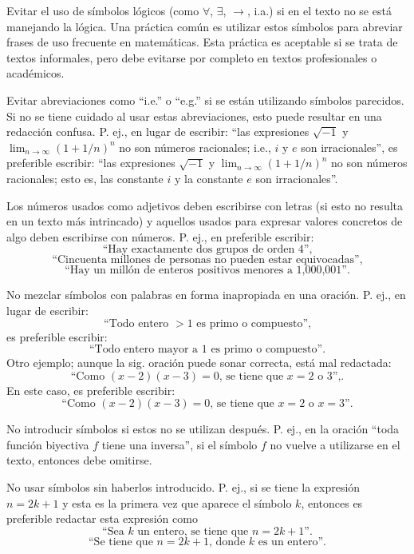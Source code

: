 Evitar el uso de símbolos lógicos (como \(\forall\), \(\exists\), \(\rightarrow\), i.a.) si en el texto no se está manejando la lógica. 
Una práctica común es utilizar estos símbolos para abreviar frases de uso frecuente en matemáticas.
Esta práctica es aceptable si se trata de textos informales, pero debe evitarse por completo en textos profesionales o académicos.

Evitar abreviaciones como ``i.e.'' o ``e.g.'' si se están utilizando símbolos parecidos.
Si no se tiene cuidado al usar estas abreviaciones, esto puede resultar en una redacción confusa.
P. ej., en lugar de escribir: ``las expresiones
\(\sqrt{-1}\) y \(\lim_{n\to\infty}(1+1/n)^{n}\) no son números
racionales; i.e., \(i\) y \(e\) son irracionales'', es preferible escribir: ``las expresiones \(\sqrt{-1}\) y \(\lim_{n\to\infty}\left(1+1/n\right)^{n}\)
no son números racionales; esto es, las constante $i$ y la constante $e$ son
irracionales''.

Los números usados como adjetivos deben escribirse con letras (si esto no resulta en un texto más intrincado) y aquellos usados para expresar valores concretos de algo deben escribirse con números.
P. ej., en preferible escribir:
\[
  \text{``Hay exactamente dos grupos de orden 4'',}
\]
\[
  \text{``Cincuenta millones de personas no pueden estar equivocadas'',}
\]
\[
  \text{``Hay un millón de enteros positivos menores a 1,000,001''.}
\]

No mezclar símbolos con palabras en forma inapropiada en una oración.
P. ej., en lugar de escribir:
\[
  \text{``Todo entero }>1\text{ es primo o compuesto'',}
\]
es preferible escribir:
\[
  \text{``Todo entero mayor a 1 es primo o compuesto''.}
\]
Otro ejemplo; aunque la sig. oración puede sonar correcta, está mal
redactada:
\[
  \text{``Como }(x-2)(x-3)=0\text{, se tiene que }x=2\text{ o }3\text{'',}.
\]
En este caso, es preferible escribir:
\[
  \text{``Como }(x-2)(x-3)=0\text{, se tiene que }x=2\text{ o }x=3\text{''}.
\]

No introducir símbolos si estos no se utilizan después.
P. ej., en la oración ``toda función biyectiva \(f\) tiene una inversa'',
si el símbolo \(f\) no vuelve a utilizarse en el texto, entonces
debe omitirse.

No usar símbolos sin haberlos introducido.
P. ej., si se tiene la expresión \(n=2k+1\) y esta es la primera vez que aparece
el símbolo \(k\), entonces es preferible redactar esta expresión como
\[
  \text{``Sea }k\text{ un entero, se tiene que }n=2k+1\text{''}.
\]
\[
  \text{``Se tiene que }n=2k+1\text{, donde }k\text{ es un entero''.}
\]

